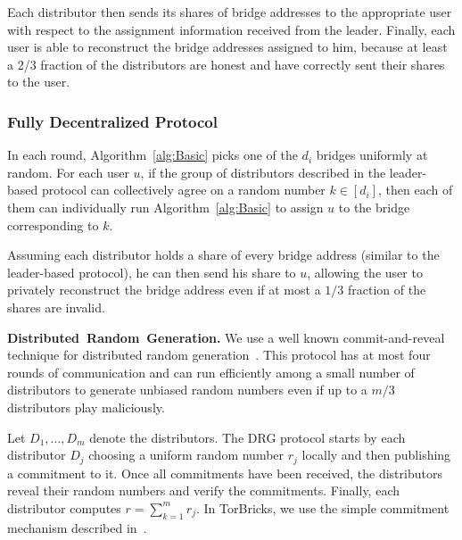 \documentclass[a4paper,UKenglish]{lipics-v2016}
\newcommand{\algFont}{\fontsize{10}{13}\selectfont}
\newcommand{\bricks}{}
\def\bricks/{\mbox{TorBricks}}
\newcommand{\sfsize}{\fontsize{0.68\baselineskip}{0.68\baselineskip}\selectfont}
\newcommand{\sans}[1]{\textbf{\textsf{\sfsize \mbox{#1}}}}
\newcommand{\para}[1]{\vspace{0.55em} \noindent \sans{{\mbox{#1}}}}
\begin{document}
Each distributor then sends its shares of bridge addresses to the appropriate user with respect to the assignment information received from the leader. Finally, each user is able to reconstruct the bridge addresses assigned to him, because at least a 2/3 fraction of the distributors are honest and have correctly sent their shares to the user.
%	

\subsubsection{Fully Decentralized Protocol} \label{sec:decentralized-alg}
In each round, Algorithm~\ref{alg:Basic} picks one of the $d_i$ bridges uniformly at random. For each user $u$, if the group of distributors described in the leader-based protocol can collectively agree on a random number ${k \in [d_i]}$, then each of them can individually run Algorithm~\ref{alg:Basic} to assign $u$ to the bridge corresponding to $k$. 

Assuming each distributor holds a share of every bridge address (similar to the leader-based protocol), he can then send his share to $u$, allowing the user to privately reconstruct the bridge address even if at most a $1/3$ fraction of the shares are invalid.

\para{Distributed Random Generation.} 
We use a well known commit-and-reveal technique for distributed random generation~\cite{cryptoeprint:2015:366, Tor:DRG:Proposal:2015}. This protocol has at most four rounds of communication and can run efficiently among a small number of distributors to generate unbiased random numbers even if up to a $m/3$ distributors play maliciously.

Let $D_1,...,D_m$ denote the distributors. The DRG protocol starts by each distributor $D_j$ choosing a uniform random number $r_j$ locally and then publishing a commitment to it. Once all commitments have been received, the distributors reveal their random numbers and verify the commitments. Finally, each distributor computes $r = \sum_{k=1}^m{r_j}$. In \bricks/, we use the simple commitment mechanism described in~\cite{Tor:DRG:Proposal:2015}.
\end{document}

